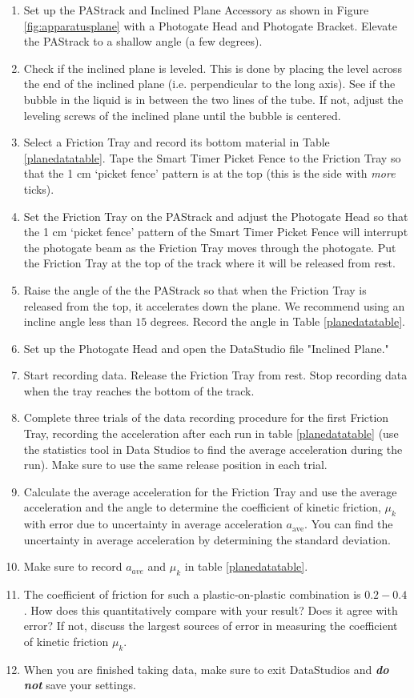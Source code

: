 \begin{enumerate}
    \item Set up the PAStrack and Inclined Plane Accessory as shown in Figure \ref{fig:apparatusplane} with a Photogate Head and Photogate Bracket. Elevate the PAStrack to a shallow angle (a few degrees).
    \item Check if the inclined plane is leveled.  This is done by placing the level across the end of the inclined plane (i.e. perpendicular to the long axis).  See if the bubble in the liquid is in between the two lines of the tube.  If not, adjust the leveling screws of the inclined plane until the bubble is centered.
    \item Select a Friction Tray and record its bottom material in Table \ref{planedatatable}. Tape the Smart Timer Picket Fence to the Friction Tray so that the 1 cm `picket fence' pattern is at the top (this is the side with {\it{more}} ticks).
    \item Set the Friction Tray on the PAStrack and adjust the Photogate Head so that the 1 cm `picket fence' pattern of the Smart Timer Picket Fence will interrupt the photogate beam as the Friction Tray moves through the photogate.  Put the Friction Tray at the top of the track where it will be released from rest.
    \item Raise the angle of the the PAStrack so that when the Friction Tray is released from the top, it accelerates down the plane. We recommend using an incline angle less than $15$ degrees. Record the angle in Table \ref{planedatatable}.
    \item Set up the Photogate Head and open the DataStudio file "Inclined Plane."
    \item Start recording data.  Release the Friction Tray from rest.  Stop recording data when the tray reaches the bottom of the track.
    \item Complete three trials of the data recording procedure for the first Friction Tray, recording the acceleration after each run in table \ref{planedatatable} (use the statistics tool in Data Studios to find the average acceleration during the run). Make sure to use the same release position in each trial.
    \item Calculate the average acceleration for the Friction Tray and use the average acceleration and the angle to determine the coefficient of kinetic friction, $\mu_k$ with error due to uncertainty in average acceleration $a_\text{ave}$. You can find the uncertainty in average acceleration by determining the standard deviation.
    \item  Make sure to record $a_{ave}$ and $\mu_k$ in table \ref{planedatatable}.
    \item The coefficient of friction for such a plastic-on-plastic combination is $0.2-0.4$.  How does this quantitatively compare with your result? Does it agree with error? If not, discuss the largest sources of error in measuring the coefficient of kinetic friction $\mu_k$.
    \item When you are finished taking data, make sure to exit DataStudios and {\bf{\it{do not}}} save your settings.
\end{enumerate}

